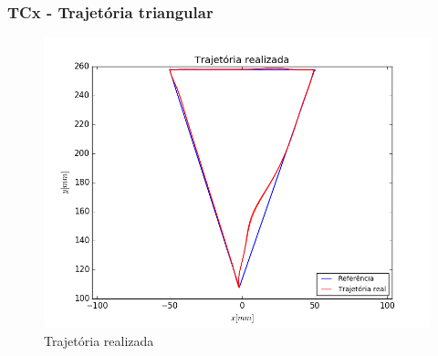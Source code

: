 \documentclass[]{politex}
\begin{document}
\subsubsection{TCx - Trajetória triangular}

\begin{figure}[H]
	\centering
	\includegraphics[scale=0.39]{../../../Experimental/Aquisicoes/CTCx_triangulo/xy.png}  
	\caption{Trajetória realizada}
	\label{fig:CTCx_triangulo_xy}
\end{figure}
\end{document}
